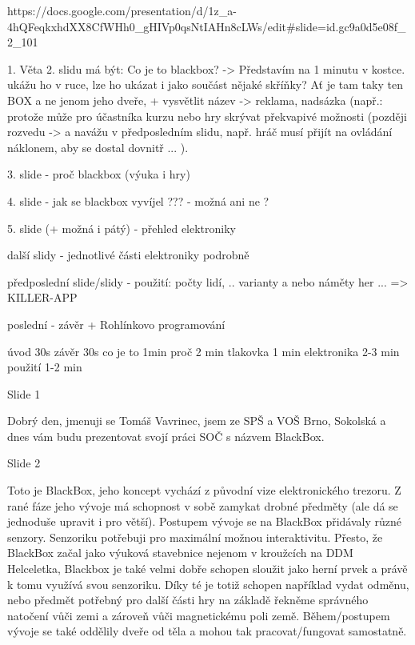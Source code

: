 https://docs.google.com/presentation/d/1z_a-4hQFeqkxhdXX8CfWHh0_gHIVp0qsNtIAHn8cLWs/edit#slide=id.gc9a0d5e08f_2_101

1. Věta 2. slidu má být: Co je to blackbox? -> Představím na 1 minutu v kostce.  
ukážu ho v ruce, lze ho ukázat i jako součást nějaké skříňky? Ať je tam taky ten BOX  
a ne jenom jeho dveře, 
+ vysvětlit název -> reklama, nadsázka (např.: protože může pro účastníka kurzu nebo 
hry skrývat překvapivé možnosti (později rozvedu -> a navážu v předposledním slidu, 
např. hráč musí přijít na ovládání náklonem, aby se dostal dovnitř ... ).


3. slide - proč blackbox (výuka i hry)

4. slide - jak se blackbox vyvíjel ??? - možná ani ne ? 

5. slide (+ možná i pátý) - přehled elektroniky 

další slidy - jednotlivé části elektroniky podrobně 


předposlední slide/slidy - použití: počty lidí, .. varianty a nebo náměty her ... => KILLER-APP

poslední - závěr + Rohlínkovo programování  

úvod 30s závěr 30s 
co je to 1min 
proč 2 min 
tlakovka 1 min 
elektronika 2-3 min 
použití 1-2 min 


Slide 1

Dobrý den, jmenuji se Tomáš Vavrinec, jsem ze SPŠ a VOŠ Brno, Sokolská
a dnes vám budu prezentovat svojí práci SOČ s názvem BlackBox.



Slide 2

Toto je BlackBox, jeho koncept vychází z původní vize elektronického trezoru.
Z rané fáze jeho vývoje má schopnost v sobě zamykat drobné předměty (ale dá se jednoduše upravit i pro větší).
Postupem vývoje se na BlackBox přidávaly různé senzory. 
Senzoriku potřebuji pro maximální možnou interaktivitu. Přesto, že BlackBox začal jako výuková stavebnice 
nejenom v kroužcích na DDM Helceletka,  %
Blackbox je také velmi dobře 
schopen sloužit jako herní prvek a právě k tomu využívá svou senzoriku. Díky té je totiž schopen například vydat odměnu, nebo
předmět potřebný pro další části hry na základě řekněme správného natočení vůči zemi a zároveň vůči magnetickému poli země.
Během/postupem vývoje se také oddělily dveře od těla a mohou tak pracovat/fungovat samostatně.

